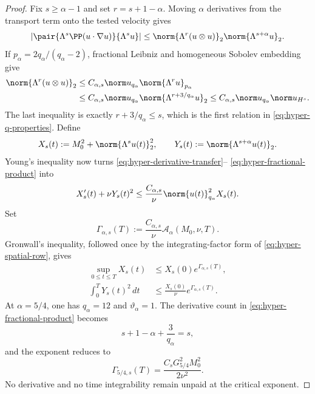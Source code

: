 \begin{proof}
Fix \(s\ge\alpha-1\) and set \(r=s+1-\alpha\).  Moving \(\alpha\)
derivatives from the transport term onto the tested velocity gives
\begin{equation}
 \left|\pair{\Lambda^s\PP(u\cdot\nabla u)}{\Lambda^su}\right|
 \le
 \norm{\Lambda^r(u\otimes u)}_2
 \norm{\Lambda^{s+\alpha}u}_2.
 \label{eq:hyper-derivative-transfer}
\end{equation}
If \(p_\alpha=2q_\alpha/(q_\alpha-2)\), fractional Leibniz and homogeneous
Sobolev embedding give
\begin{align}
 \norm{\Lambda^r(u\otimes u)}_2
 &\le C_{\alpha,s}\norm u_{q_\alpha}
             \norm{\Lambda^ru}_{p_\alpha}
 \notag\\
 &\le C_{\alpha,s}\norm u_{q_\alpha}
             \norm{\Lambda^{r+3/q_\alpha}u}_2
 \le C_{\alpha,s}\norm u_{q_\alpha}\norm u_{H^s}.
 \label{eq:hyper-fractional-product}
\end{align}
The last inequality is exactly
\(r+3/q_\alpha\le s\), which is the first relation in
\eqref{eq:hyper-q-properties}.  Define
\begin{equation}
 X_s(t):=M_0^2+\norm{\Lambda^su(t)}_2^2,
 \qquad
 Y_s(t):=\norm{\Lambda^{s+\alpha}u(t)}_2.
 \label{eq:hyper-spatial-variables}
\end{equation}
Young's inequality now turns
\eqref{eq:hyper-derivative-transfer}--
\eqref{eq:hyper-fractional-product} into
\begin{equation}
 X_s'(t)+\nu Y_s(t)^2
 \le\frac{C_{\alpha,s}}{\nu}
       \norm{u(t)}_{q_\alpha}^2X_s(t).
 \label{eq:hyper-spatial-row}
\end{equation}
Set
\begin{equation}
 \Gamma_{\alpha,s}(T)
 :=\frac{C_{\alpha,s}}{\nu}
       \mathcal A_\alpha(M_0,\nu,T).
 \label{eq:hyper-spatial-exponent}
\end{equation}
Gronwall's inequality, followed once by the integrating-factor form of
\eqref{eq:hyper-spatial-row}, gives
\begin{align}
 \sup_{0\le t\le T}X_s(t)
 &\le X_s(0)e^{\Gamma_{\alpha,s}(T)},
 \label{eq:hyper-spatial-row-sup}\\
 \int_0^TY_s(t)^2\,dt
 &\le\frac{X_s(0)}{\nu}e^{\Gamma_{\alpha,s}(T)}.
 \label{eq:hyper-spatial-row-dissipation}
\end{align}
At \(\alpha=5/4\), one has \(q_\alpha=12\) and
\(\vartheta_\alpha=1\).  The derivative count in
\eqref{eq:hyper-fractional-product} becomes
\[
 s+1-\alpha+\frac3{q_\alpha}=s,
\]
and the exponent reduces to
\begin{equation}
 \Gamma_{5/4,s}(T)
 =\frac{C_sG_{5/4}^2M_0^2}{2\nu^2}.
 \label{eq:hyper-critical-exponent}
\end{equation}
No derivative and no time integrability remain unpaid at the critical
exponent.


\end{proof}
